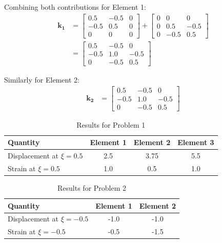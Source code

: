 \documentclass[12pt,a4paper]{article}
\begin{document}
Combining both contributions for Element 1:
\begin{align}
\mathbf{k_1} &= \begin{bmatrix} 0.5 & -0.5 & 0 \\ -0.5 & 0.5 & 0 \\ 0 & 0 & 0 \end{bmatrix} + \begin{bmatrix} 0 & 0 & 0 \\ 0 & 0.5 & -0.5 \\ 0 & -0.5 & 0.5 \end{bmatrix} \\
&= \begin{bmatrix} 0.5 & -0.5 & 0 \\ -0.5 & 1.0 & -0.5 \\ 0 & -0.5 & 0.5 \end{bmatrix}
\end{align}

Similarly for Element 2:
\begin{align}
\mathbf{k_2} &= \begin{bmatrix} 0.5 & -0.5 & 0 \\ -0.5 & 1.0 & -0.5 \\ 0 & -0.5 & 0.5 \end{bmatrix}
\end{align}

\begin{table}[H]
\centering
\begin{tabular}{lccc}
\toprule
\textbf{Quantity} & \textbf{Element 1} & \textbf{Element 2} & \textbf{Element 3} \\
\midrule
Displacement at $\xi = 0.5$ & 2.5 & 3.75 & 5.5 \\
Strain at $\xi = 0.5$ & 1.0 & 0.5 & 1.0 \\
\bottomrule
\end{tabular}
\caption{Results for Problem 1}
\end{table}

\begin{table}[H]
\centering
\begin{tabular}{lcc}
\toprule
\textbf{Quantity} & \textbf{Element 1} & \textbf{Element 2} \\
\midrule
Displacement at $\xi = -0.5$ & -1.0 & -1.0 \\
Strain at $\xi = -0.5$ & -0.5 & -1.5 \\
\bottomrule
\end{tabular}
\caption{Results for Problem 2}
\end{table}
\end{document}
